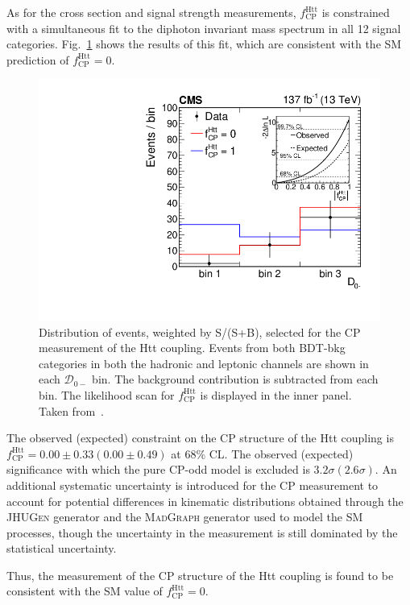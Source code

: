 As for the cross section and signal strength measurements, $f^{\text{Htt}}_{\text{CP}}$ is constrained with a simultaneous fit to the diphoton invariant mass spectrum in all 12 signal categories.
Fig.~\ref{fig:tth_cp} shows the results of this fit, which are consistent with the SM prediction of $f^{\text{Htt}}_{\text{CP}} = 0$.
\begin{figure} [htbp!]
    \centering
    \includegraphics[width=\linewidth]{figures/tth/Figure_003.png}
    \caption{Distribution of events, weighted by S/(S+B), selected for the CP measurement of the Htt coupling. Events from both BDT-bkg categories in both the hadronic and leptonic channels are shown in each $\mathcal D_{0-}$ bin. The background contribution is subtracted from each bin. The likelihood scan for $f^{\text{Htt}}_{\text{CP}}$ is displayed in the inner panel. Taken from~\cite{tth_observation}.}
    \label{fig:tth_cp}
\end{figure}
The observed (expected) constraint on the CP structure of the Htt coupling is $f^{\text{Htt}}_{\text{CP}} = 0.00 \pm 0.33 (0.00 \pm 0.49)$ at 68\% CL.
The observed (expected) significance with which the pure CP-odd model is excluded is $3.2\sigma (2.6\sigma)$.
An additional systematic uncertainty is introduced for the CP measurement to account for potential differences in kinematic distributions obtained through the \textsc{JHUGen} generator and the \textsc{MadGraph} generator used to model the SM processes, though the uncertainty in the measurement is still dominated by the statistical uncertainty.

Thus, the measurement of the CP structure of the Htt coupling is found to be consistent with the SM value of $f^{\text{Htt}}_{\text{CP}} = 0$.

